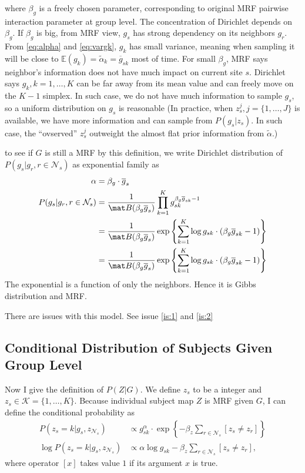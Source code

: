 \documentclass{article}
\begin{document}
where $\beta_g$ is a freely chosen parameter, corresponding to original MRF pairwise interaction parameter at group level. The concentration of Dirichlet depends on $\beta_g$. If $\beta_g$  is big, from MRF view, $g_s$ has strong dependency on its neighbors $g_r$. From \eqref{eq:alpha} and \eqref{eq:vargk}, $g_k$ has small variance, meaning when sampling it will be close to $\mathbb{E}(g_k) = \tilde \alpha_k = \overline{g}_{sk}$ most of time. For small $\beta_g$, MRF says neighbor's information does not have much impact on current site $s$. Dirichlet says $g_k, k = 1,\dots, K$ can be far away from its mean value and can freely move on the $K-1$ simplex. In such case, we do not have much information to sample $g_s$, so a uniform distribution on $g_s$ is reasonable (In practice, when $z_s^j, j=\{1,\dots, J\}$ is available, we have more information and can sample from $P(g_s | z_s)$. In such case, the ``ovserved'' $z_s^j$ outweight the almost flat prior information from $\tilde \alpha$.)

to see if $G$ is still a MRF by this definition, we write Dirichlet distribution of $P(g_s | g_r, r \in \mathcal{N}_s)$ as exponential family as
\begin{align*}
  \alpha &= \beta_g \cdot \overline{g}_s \\
  P(g_s | g_r, r \in \mathcal{N}_s) &= \frac{1}{\mat B(\beta_g \overline{g}_s)} \prod_{k=1}^{K} g_{sk}^{\beta_g \overline{g}_{sk} - 1} \\
&= \frac{1}{\mat B(\beta_g \overline{g}_s)} \exp \left \{\sum_{k=1}^{K} \log g_{sk} \cdot (\beta_g \overline{g}_{sk} - 1) \right \}\\
&= \frac{1}{\mat B(\beta_g \overline{g}_s)} \exp \left \{\sum_{k=1}^{K} \log g_{sk} \cdot (\beta_g \overline{g}_{sk} - 1) \right \}\\
\end{align*}
The exponential is a function of only the neighbors. Hence it is Gibbs distribution and MRF.

There are issues with this model. See issue \ref{is:1} and \ref{is:2}

\subsection{Conditional Distribution of Subjects Given Group Level}\label{sec:z}
Now I give the definition of $P(Z | G)$. We define $z_s$ to be a integer and $z_s \in \mathcal{K} = \{1, \dots, K\}$. Because individual subject map $Z$ is MRF given $G$, I can define the conditional probability as
\begin{align*}
  P(z_s = k| g_s, z_{\mathcal{N}_s}) &\propto  g_{sk}^{\alpha} \cdot \exp \left \{ - \beta_z \sum_{r \in \mathcal{N}_s} [z_s \neq z_r] \right \} \\
  \log P(z_s = k| g_s, z_{\mathcal{N}_s}) &\propto  \alpha  \log g_{sk} - \beta_z  \sum_{r \in \mathcal{N}_s} [z_s \neq z_r],
\end{align*}
where operator $[x]$ takes value $1$ if its argument $x$ is true.
\end{document}
